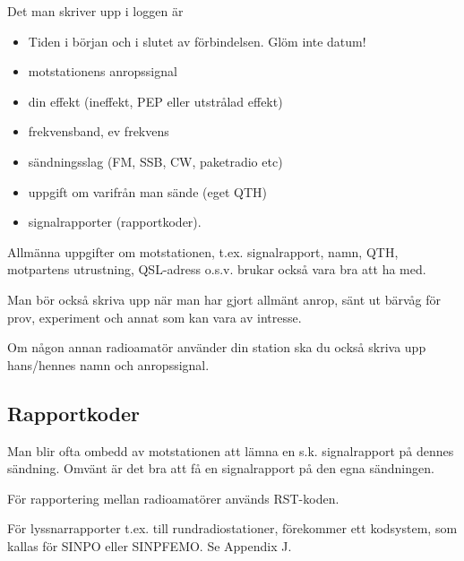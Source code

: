 Det man skriver upp i loggen är
\begin{itemize}
  \item Tiden i början och i slutet av förbindelsen. Glöm inte datum!
  \item motstationens anropssignal
  \item din effekt (ineffekt, PEP eller utstrålad effekt)
  \item frekvensband, ev frekvens
  \item sändningsslag (FM, SSB, CW, paketradio etc)
  \item uppgift om varifrån man sände (eget QTH)
  \item signalrapporter (rapportkoder).
\end{itemize}

Allmänna uppgifter om motstationen, t.ex. signalrapport, namn, QTH,
motpartens utrustning, QSL-adress o.s.v. brukar också vara bra att ha
med.

Man bör också skriva upp när man har gjort allmänt anrop, sänt ut
bärvåg för prov, experiment och annat som kan vara av intresse.

Om någon annan radioamatör använder din station ska du också skriva
upp hans/hennes namn och anropssignal.

\subsection{Rapportkoder}

Man blir ofta ombedd av motstationen att lämna en s.k. signalrapport
på dennes sändning. Omvänt är det bra att få en signalrapport på den
egna sändningen.

För rapportering mellan radioamatörer används RST-koden.

För lyssnarrapporter t.ex. till rundradiostationer, förekommer ett
kodsystem, som kallas för SINPO eller SINPFEMO. Se Appendix J.

